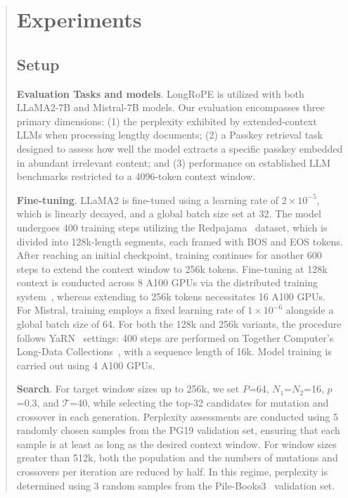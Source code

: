 \begin{abstract}
 \section{Experiments}

\label{sec:exp}
\subsection{Setup}
\textbf{Evaluation Tasks and models}. LongRoPE is utilized with both LLaMA2-7B and Mistral-7B models. Our evaluation encompasses three primary dimensions: (1) the perplexity exhibited by extended-context LLMs when processing lengthy documents; (2) a Passkey retrieval task designed to assess how well the model extracts a specific passkey embedded in abundant irrelevant content; and (3) performance on established LLM benchmarks restricted to a 4096-token context window.

\textbf{Fine-tuning}. LLaMA2 is fine-tuned using a learning rate of $2\times10^{-5}$, which is linearly decayed, and a global batch size set at 32. The model undergoes 400 training steps utilizing the Redpajama~\cite{redpajama} dataset, which is divided into 128k-length segments, each framed with BOS and EOS tokens. After reaching an initial checkpoint, training continues for another 600 steps to extend the context window to 256k tokens. Fine-tuning at 128k context is conducted across 8 A100 GPUs via the distributed training system~\cite{cube}, whereas extending to 256k tokens necessitates 16 A100 GPUs. For Mistral, training employs a fixed learning rate of $1\times10^{-6}$ alongside a global batch size of 64. For both the 128k and 256k variants, the procedure follows YaRN~\cite{yarn} settings: 400 steps are performed on Together Computer's Long-Data Collections~\cite{mistraldata}, with a sequence length of 16k. Model training is carried out using 4 A100 GPUs.

\textbf{Search}. For target window sizes up to 256k, we set $P$=64, $N_1$=$N_2$=16, $p$=0.3, and $\mathcal{T}$=40, while selecting the top-32 candidates for mutation and crossover in each generation. Perplexity assessments are conducted using 5 randomly chosen samples from the PG19 validation set, ensuring that each sample is at least as long as the desired context window. For window sizes greater than 512k, both the population and the numbers of mutations and crossovers per iteration are reduced by half. In this regime, perplexity is determined using 3 random samples from the Pile-Books3~\cite{pile} validation set.


\end{abstract}
